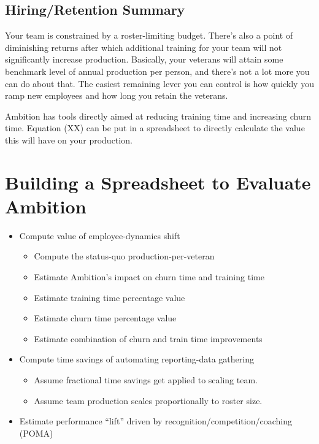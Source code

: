 \documentclass[paper=a4, fontsize=11pt abstract]{scrartcl}
\numberwithin{equation}{section}		%
\numberwithin{figure}{section}			%
\numberwithin{table}{section}				%
\begin{document}
\subsection{Hiring/Retention Summary}
Your team is constrained by a roster-limiting budget.  There's also a point of diminishing returns after which additional training for your team will not significantly increase production.  Basically, your veterans will attain some benchmark level of annual production per person, and there's not a lot more you can do about that.  The easiest remaining lever you can control is how quickly you ramp new employees and how long you retain the veterans.

Ambition has tools directly aimed at reducing training time and increasing churn time.  Equation (XX) can be put in a spreadsheet to directly calculate the value this will have on your production.

\section{Building a Spreadsheet to Evaluate Ambition}
\begin{itemize}
    \item Compute value of employee-dynamics shift
    \begin{itemize}
        \item Compute the status-quo production-per-veteran
        \item Estimate Ambition's impact on churn time and training time
        \item Estimate training time percentage value
        \item Estimate churn time percentage value
        \item Estimate combination of churn and train time improvements
    \end{itemize}
    \item Compute time savings of automating reporting-data gathering
    \begin{itemize}
        \item Assume fractional time savings get applied to scaling team.
        \item Assume team production scales proportionally to roster size.
    \end{itemize}
    \item Estimate performance ``lift'' driven by recognition/competition/coaching (POMA)
\end{itemize}
\end{document}
